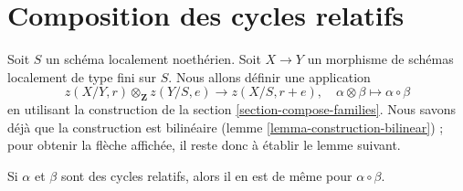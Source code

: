 \section{Composition des cycles relatifs} 
\label{section-compose} 

\noindent
 Soit  $S$  un schéma localement noethérien. Soit  $X \to Y$
  un morphisme de schémas localement de type fini sur  $S$.
 Nous allons définir une application 
$$
z(X/Y, r) \otimes_\mathbf{Z} z(Y/S, e) \longrightarrow z(X/S, r + e),\quad
\alpha \otimes \beta \longmapsto \alpha \circ \beta
$$
 en utilisant la construction de la section \ref{section-compose-families}. 
Nous savons déjà que la construction est bilinéaire
 (lemme \ref{lemma-construction-bilinear}) ; 
pour obtenir la flèche affichée, il reste donc à établir le lemme suivant. 

\begin{lemma} 
\label{lemma-well-defined} 
Si  $\alpha$  et  $\beta$  sont des cycles relatifs, alors il en est de même pour  $\alpha \circ \beta$. 
\end{lemma} 

